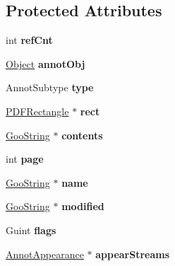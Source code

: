 \subsection*{Protected Attributes}
\begin{DoxyCompactItemize}
\item 
\mbox{\label{class_annot_a410c04f58cf4baf828bb03d4ff8c240d}} 
int {\bfseries ref\+Cnt}
\item 
\mbox{\label{class_annot_a801562ddfca661fd23ff9d23af9a4df5}} 
\hyperlink{class_object}{Object} {\bfseries annot\+Obj}
\item 
\mbox{\label{class_annot_a26ed834b680cd38d284c8674df4337c4}} 
Annot\+Subtype {\bfseries type}
\item 
\mbox{\label{class_annot_af144cf5505a2c56a9881765167540e0f}} 
\hyperlink{class_p_d_f_rectangle}{P\+D\+F\+Rectangle} $\ast$ {\bfseries rect}
\item 
\mbox{\label{class_annot_adc073b7ddfec6424a2aaae01db3d36b5}} 
\hyperlink{class_goo_string}{Goo\+String} $\ast$ {\bfseries contents}
\item 
\mbox{\label{class_annot_a8c67dbac05078824258eb790f7bf0578}} 
int {\bfseries page}
\item 
\mbox{\label{class_annot_a674697955c592a728d4607bc508f42fc}} 
\hyperlink{class_goo_string}{Goo\+String} $\ast$ {\bfseries name}
\item 
\mbox{\label{class_annot_ac707ac889cdec59593b4a8be63f9c835}} 
\hyperlink{class_goo_string}{Goo\+String} $\ast$ {\bfseries modified}
\item 
\mbox{\label{class_annot_af9d3caea50cb47418c1238d408f88cd2}} 
Guint {\bfseries flags}
\item 
\mbox{\label{class_annot_a2c50df8e594f9b3abb44b1fa1ac446df}} 
\hyperlink{class_annot_appearance}{Annot\+Appearance} $\ast$ {\bfseries appear\+Streams}
\item 
\mbox{\label{class_annot_a42b761968f21eb28bb910dbac74dfa20}} 

\end{DoxyCompactItemize}

